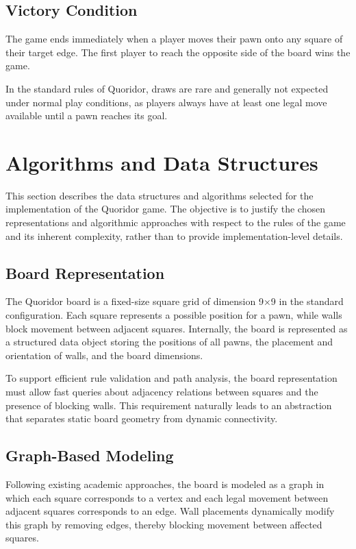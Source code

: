 \documentclass[a4paper]{article}
\begin{document}
\subsection{Victory Condition}

The game ends immediately when a player moves their pawn onto any square of
their target edge. The first player to reach the opposite side of the board
wins the game.

In the standard rules of Quoridor, draws are rare and generally not expected
under normal play conditions, as players always have at least one legal move
available until a pawn reaches its goal.

\section{Algorithms and Data Structures}

This section describes the data structures and algorithms selected for the
implementation of the Quoridor game. The objective is to justify the chosen
representations and algorithmic approaches with respect to the rules of the
game and its inherent complexity, rather than to provide implementation-level
details.

\subsection{Board Representation}

The Quoridor board is a fixed-size square grid of dimension 9×9 in the
standard configuration. Each square represents a possible position for a pawn,
while walls block movement between adjacent squares. Internally, the board is
represented as a structured data object storing the positions of all pawns,
the placement and orientation of walls, and the board dimensions.

To support efficient rule validation and path analysis, the board
representation must allow fast queries about adjacency relations between
squares and the presence of blocking walls. This requirement naturally leads
to an abstraction that separates static board geometry from dynamic
connectivity.

\subsection{Graph-Based Modeling}

Following existing academic approaches, the board is modeled as a graph in
which each square corresponds to a vertex and each legal movement between
adjacent squares corresponds to an edge. Wall placements dynamically modify
this graph by removing edges, thereby blocking movement between affected
squares.
\end{document}
